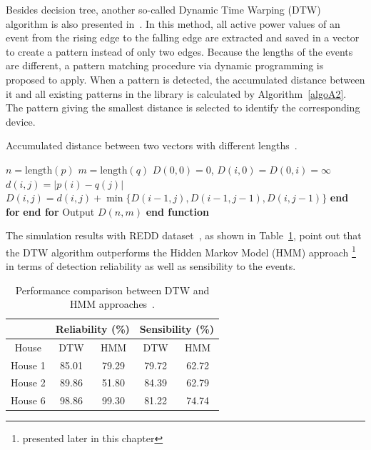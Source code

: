 Besides decision tree, another so-called Dynamic Time Warping (DTW) algorithm is also presented in~\cite{Liao14}. In this method, all active power values of an event from the rising edge to the falling edge are extracted and saved in a vector to create a pattern instead of only two edges. Because the lengths of the events are different, a pattern matching procedure via dynamic programming is proposed to apply. When a pattern is detected, the accumulated distance between it and all existing patterns in the library is calculated by Algorithm~\ref{algoA2}. The pattern giving the smallest distance is selected to identify the corresponding device. 

\begin{algorithm}[h]
\caption{Accumulated distance between two vectors with different lengths~\cite{Liao14}.}\label{algoA2}
\begin{algorithmic}[1]
	\State $n=\text{length}(p)$
	\State $m = \text{length}(q)$
	\State $D(0,0) = 0$, $D(i,0) = D(0,i)=\infty$
			\State $d(i,j)=|p(i)-q(j)|$
			\State $D(i,j) = d(i,j)+\min{\{D(i-1,j),D(i-1,j-1),D(i,j-1)\}}$
		\EndFor
		\State \textbf{end for}
	\EndFor
	\State \textbf{end for}
	\State Output $D(n,m)$
\EndFunction
\State \textbf{end function}
\end{algorithmic}
\end{algorithm}
The simulation results with REDD dataset~\cite{Liao14}, as shown in Table~\ref{TA1}, point out that the DTW algorithm outperforms the Hidden Markov Model (HMM) approach \footnote{presented later in this chapter} in terms of detection reliability as well as sensibility to the events. 
\begin{table}
\caption{Performance comparison between DTW and HMM approaches~\cite{Liao14}.}\label{TA1}
\begin{center}
\begin{tabular}{|c|c|c|c|c|}
\hline
 &\multicolumn{2}{|c|}{Reliability (\%)}  &  \multicolumn{2}{|c|}{Sensibility (\%)} \\ \hline
 House & DTW  & HMM & DTW  & HMM  \\ \hline
 House 1 & 85.01  & 79.29 & 79.72 & 62.72  \\ \hline 
 House 2 & 89.86  & 51.80 & 84.39  & 62.79  \\ \hline
 House 6 & 98.86  & 99.30 & 81.22  & 74.74  \\ \hline
\end{tabular}
\end{center}
\end{table}

